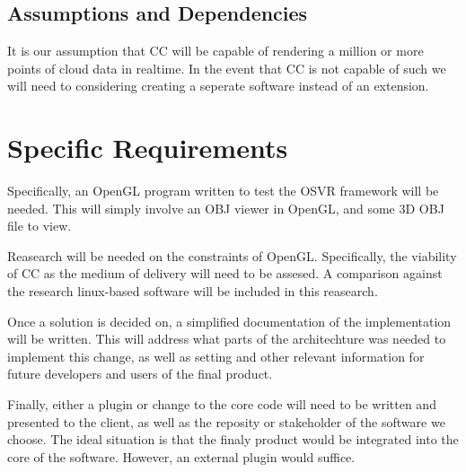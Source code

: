 \documentclass{article}
\begin{document}
\subsection{Assumptions and Dependencies}

It is our assumption that CC will be capable of rendering a million or more points of cloud data in realtime.
In the event that CC is not capable of such we will need to considering creating a seperate software instead of an extension.

\section{Specific Requirements}

Specifically, an OpenGL program written to test the OSVR framework will be needed. This will simply involve an OBJ viewer in OpenGL,
and some 3D OBJ file to view. 

Reasearch will be needed on the constraints of OpenGL. Specifically, the viability of CC as the medium of delivery will need to be
assesed. A comparison against the research linux-based software will be included in this reasearch.

Once a solution is decided on, a simplified documentation of the implementation will be written. This will address what parts of
the architechture was needed to implement this change, as well as setting and other relevant information for future developers
and users of the final product. 

Finally, either a plugin or change to the core code will need to be written and presented to the client, as well as the reposity or
stakeholder of the software we choose. The ideal situation is that the finaly product would be integrated into the core of the 
software. However, an external plugin would suffice. 
\end{document}
